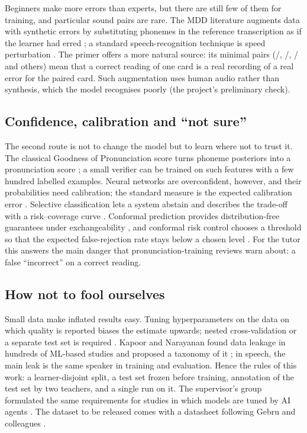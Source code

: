 \documentclass[a4paper,14pt]{extarticle}
\begin{document}
Beginners make more errors than experts, but there are still few of them for training, and particular
sound pairs are rare. The MDD literature augments data with synthetic errors by substituting phonemes in
the reference transcription as if the learner had erred \cite{SRC-119}; a standard speech-recognition
technique is speed perturbation \cite{SRC-120}. The primer offers a more natural source: its minimal
pairs (/, /, / and others) mean that a correct reading of one card is
a real recording of a real error for the paired card. Such augmentation uses human audio rather than
synthesis, which the model recognises poorly (the project's preliminary check).

\subsection{Confidence, calibration and ``not sure''}

The second route is not to change the model but to learn where not to trust it. The classical Goodness
of Pronunciation score turns phoneme posteriors into a pronunciation score \cite{SRC-115}; a small
verifier can be trained on such features with a few hundred labelled examples. Neural networks are
overconfident, however, and their probabilities need calibration; the standard measure is the expected
calibration error \cite{SRC-112}. Selective classification lets a system abstain and describes the
trade-off with a risk--coverage curve \cite{SRC-117}. Conformal prediction provides distribution-free
guarantees under exchangeability \cite{SRC-113}, and conformal risk control chooses a threshold so that
the expected false-rejection rate stays below a chosen level \cite{SRC-114}. For the tutor this answers
the main danger that pronunciation-training reviews warn about: a false ``incorrect'' on a correct
reading.

\subsection{How not to fool ourselves}

Small data make inflated results easy. Tuning hyperparameters on the data on which quality is reported
biases the estimate upwards; nested cross-validation or a separate test set is required \cite{SRC-121}.
Kapoor and Narayanan found data leakage in hundreds of ML-based studies and proposed a taxonomy of it
\cite{SRC-122}; in speech, the main leak is the same speaker in training and evaluation. Hence the rules
of this work: a learner-disjoint split, a test set frozen before training, annotation of the test
set by two teachers, and a single run on it. The supervisor's group formulated the same requirements for studies in
which models are tuned by AI agents \cite{SRC-067}. The dataset to be released comes with a datasheet
following Gebru and colleagues \cite{SRC-123}.
\end{document}
